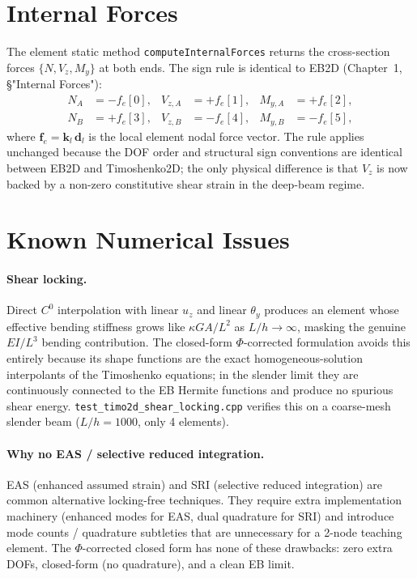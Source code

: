 \documentclass[11pt,a4paper]{article}
\newcommand{\bmath}[1]{\boldsymbol{#1}}
\begin{document}
\section{Internal Forces}

The element static method \texttt{computeInternalForces} returns the cross-section forces $\{N, V_z, M_y\}$ at both ends. The sign rule is identical to EB2D (Chapter~1, \S "Internal Forces"):
\[
\boxed{\begin{aligned}
N_A &= -f_e[0], & V_{z,A} &= +f_e[1], & M_{y,A} &= +f_e[2], \\
N_B &= +f_e[3], & V_{z,B} &= -f_e[4], & M_{y,B} &= -f_e[5],
\end{aligned}}
\]
where $\bmath{f}_e = \bmath{k}_l\,\bmath{d}_l$ is the local element nodal force vector. The rule applies unchanged because the DOF order and structural sign conventions are identical between EB2D and Timoshenko2D; the only physical difference is that $V_z$ is now backed by a non-zero constitutive shear strain in the deep-beam regime.

\section{Known Numerical Issues}\label{sec:locking}

\paragraph{Shear locking.}
Direct $C^0$ interpolation with linear $u_z$ and linear $\theta_y$ produces an element whose effective bending stiffness grows like $\kappa GA / L^2$ as $L/h \to \infty$, masking the genuine $EI/L^3$ bending contribution. The closed-form $\Phi$-corrected formulation avoids this entirely because its shape functions are the exact homogeneous-solution interpolants of the Timoshenko equations; in the slender limit they are continuously connected to the EB Hermite functions and produce no spurious shear energy. \texttt{test\_timo2d\_shear\_locking.cpp} verifies this on a coarse-mesh slender beam ($L/h = 1000$, only 4 elements).

\paragraph{Why no EAS / selective reduced integration.}
EAS (enhanced assumed strain) and SRI (selective reduced integration) are common alternative locking-free techniques. They require extra implementation machinery (enhanced modes for EAS, dual quadrature for SRI) and introduce mode counts / quadrature subtleties that are unnecessary for a 2-node teaching element. The $\Phi$-corrected closed form has none of these drawbacks: zero extra DOFs, closed-form (no quadrature), and a clean EB limit.
\end{document}
